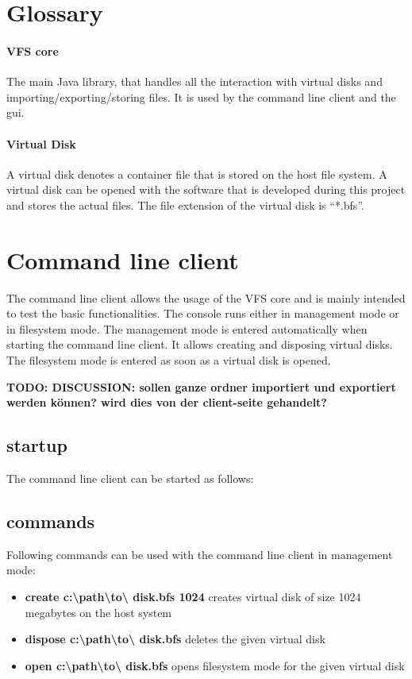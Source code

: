 \section{Glossary}

\paragraph{VFS core} The main Java library, that handles all the interaction
with virtual disks and importing/exporting/storing files. It is used by the
command line client and the gui.

\paragraph{Virtual Disk} A virtual disk denotes a container file that is stored
on the host file system. A virtual disk can be opened with the software that is
developed during this project and stores the actual files. The file extension of
the virtual disk is ``*.bfs''.


\section{Command line client}

The command line client allows the usage of the VFS core and is mainly intended
to test the basic functionalities. The console runs either in  management mode
or in filesystem mode. The management mode is entered automatically when
starting the command line client. It allows creating and disposing virtual
disks. The filesystem mode is entered as soon as a virtual disk is opened.

\textbf{TODO: DISCUSSION: sollen ganze ordner importiert und exportiert werden
können? wird dies von der client-seite gehandelt?}

\subsection{startup}
The command line client can be started as follows:


\subsection{commands}
Following commands can be used with the command line client in management mode:

\begin{itemize}
  \item{\textbf{create c:\textbackslash path\textbackslash to\textbackslash
  disk.bfs 1024}} creates virtual disk of size 1024 megabytes on the host
  system
  \item {\textbf{dispose c:\textbackslash path\textbackslash to\textbackslash
  disk.bfs}} deletes the given virtual disk
  \item {\textbf{open c:\textbackslash path\textbackslash to\textbackslash
  disk.bfs}} opens filesystem mode for the given virtual disk
\end{itemize}

